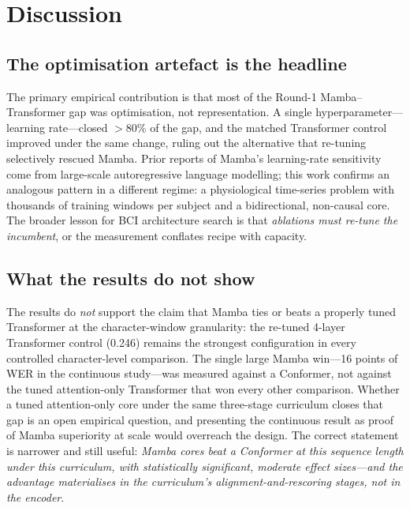 \documentclass[11pt,a4paper]{report}
\begin{document}
\chapter{Discussion}
\label{ch:discussion}

\section{The optimisation artefact is the headline}
The primary empirical contribution is that most of the Round-1
Mamba--Transformer gap was optimisation, not representation. A single
hyperparameter---learning rate---closed $>$80\% of the gap, and the matched
Transformer control improved under the same change, ruling out the
alternative that re-tuning selectively rescued Mamba. Prior reports of
Mamba's learning-rate sensitivity \citep{gu2023mamba,dao2024transformers}
come from large-scale autoregressive language modelling; this work confirms
an analogous pattern in a different regime: a physiological time-series
problem with thousands of training windows per subject and a bidirectional,
non-causal core. The broader lesson for BCI architecture search is that
\emph{ablations must re-tune the incumbent}, or the measurement conflates
recipe with capacity.

\section{What the results do not show}
The results do \emph{not} support the claim that Mamba ties or beats a
properly tuned Transformer at the character-window granularity: the re-tuned
4-layer Transformer control (0.246) remains the strongest configuration in
every controlled character-level comparison. The single large Mamba win---16
points of WER in the continuous study---was measured against a Conformer,
not against the tuned attention-only Transformer that won every other
comparison. Whether a tuned attention-only core under the same three-stage
curriculum closes that gap is an open empirical question, and presenting the
continuous result as proof of Mamba superiority at scale would overreach the
design. The correct statement is narrower and still useful: \emph{Mamba
cores beat a Conformer at this sequence length under this curriculum, with
statistically significant, moderate effect sizes---and the advantage
materialises in the curriculum's alignment-and-rescoring stages, not in the
encoder}.
\end{document}
